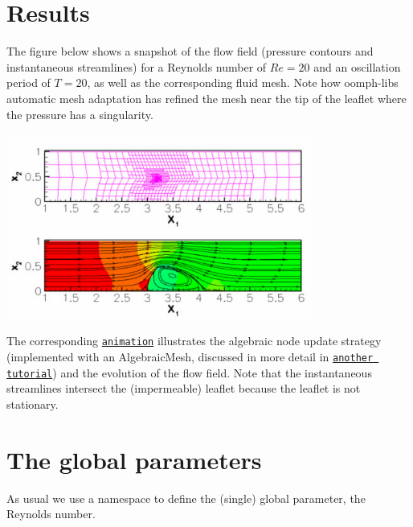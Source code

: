  

\hypertarget{index_results}{}\section{Results}\label{index_results}
The figure below shows a snapshot of the flow field (pressure contours and instantaneous streamlines) for a Reynolds number of $ Re=20 $ and an oscillation period of $ T=20 $, as well as the corresponding fluid mesh. Note how {\ttfamily oomph-\/lib\textquotesingle{}s} automatic mesh adaptation has refined the mesh near the tip of the leaflet where the pressure has a singularity.

 
\begin{DoxyImage}
\includegraphics[width=0.75\textwidth]{channel_with_leaflet_flow_cropped}
\end{DoxyImage}


The corresponding \href{../figures/channel_with_leaflet_flow.avi}{\tt animation} illustrates the algebraic node update strategy (implemented with an {\ttfamily Algebraic\+Mesh}, discussed in more detail in \href{../../algebraic_collapsible_channel/html/index.html}{\tt another tutorial}) and the evolution of the flow field. Note that the instantaneous streamlines intersect the (impermeable) leaflet because the leaflet is not stationary.



 

\hypertarget{index_parameters}{}\section{The global parameters}\label{index_parameters}
As usual we use a namespace to define the (single) global parameter, the Reynolds number.

